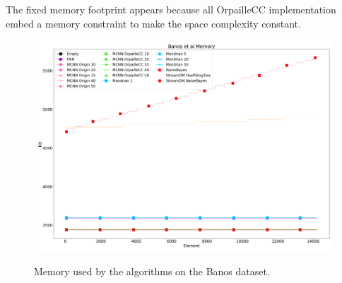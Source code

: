 The fixed memory footprint appears because all OrpailleCC implementation embed
a memory constraint to make the space complexity constant.

\begin{figure}[H]
	\includegraphics[width=\linewidth]{figures/results/banos_memory.png}
	\label{fig:memory}
	\caption{Memory used by the algorithms on the Banos dataset.}
\end{figure}

